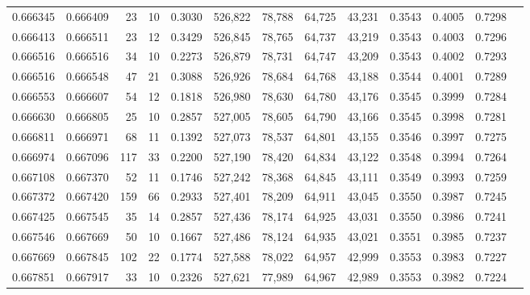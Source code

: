 \begin{tabular}{rrrrrrrrrrrrr}
0.666345 & 0.666409 &    23 &  10 &                                     0.3030 & 526,822 &  78,788 &  64,725 &  43,231 & 0.3543 & 0.4005 & 0.7298 \\
0.666413 & 0.666511 &    23 &  12 &                                     0.3429 & 526,845 &  78,765 &  64,737 &  43,219 & 0.3543 & 0.4003 & 0.7296 \\
0.666516 & 0.666516 &    34 &  10 &                                     0.2273 & 526,879 &  78,731 &  64,747 &  43,209 & 0.3543 & 0.4002 & 0.7293 \\
0.666516 & 0.666548 &    47 &  21 &                                     0.3088 & 526,926 &  78,684 &  64,768 &  43,188 & 0.3544 & 0.4001 & 0.7289 \\
0.666553 & 0.666607 &    54 &  12 &                                     0.1818 & 526,980 &  78,630 &  64,780 &  43,176 & 0.3545 & 0.3999 & 0.7284 \\
0.666630 & 0.666805 &    25 &  10 &                                     0.2857 & 527,005 &  78,605 &  64,790 &  43,166 & 0.3545 & 0.3998 & 0.7281 \\
0.666811 & 0.666971 &    68 &  11 &                                     0.1392 & 527,073 &  78,537 &  64,801 &  43,155 & 0.3546 & 0.3997 & 0.7275 \\
0.666974 & 0.667096 &   117 &  33 &                                     0.2200 & 527,190 &  78,420 &  64,834 &  43,122 & 0.3548 & 0.3994 & 0.7264 \\
0.667108 & 0.667370 &    52 &  11 &                                     0.1746 & 527,242 &  78,368 &  64,845 &  43,111 & 0.3549 & 0.3993 & 0.7259 \\
0.667372 & 0.667420 &   159 &  66 &                                     0.2933 & 527,401 &  78,209 &  64,911 &  43,045 & 0.3550 & 0.3987 & 0.7245 \\
0.667425 & 0.667545 &    35 &  14 &                                     0.2857 & 527,436 &  78,174 &  64,925 &  43,031 & 0.3550 & 0.3986 & 0.7241 \\
0.667546 & 0.667669 &    50 &  10 &                                     0.1667 & 527,486 &  78,124 &  64,935 &  43,021 & 0.3551 & 0.3985 & 0.7237 \\
0.667669 & 0.667845 &   102 &  22 &                                     0.1774 & 527,588 &  78,022 &  64,957 &  42,999 & 0.3553 & 0.3983 & 0.7227 \\
0.667851 & 0.667917 &    33 &  10 &                                     0.2326 & 527,621 &  77,989 &  64,967 &  42,989 & 0.3553 & 0.3982 & 0.7224 \\

\end{tabular}
